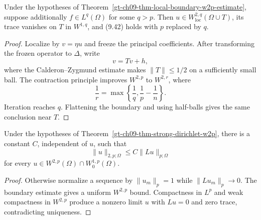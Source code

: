 \begin{lemma}
\label{gt-ch09-lem-boundary-integrability-bootstrap}
Under the hypotheses of
Theorem~\ref{gt-ch09-thm-local-boundary-w2p-estimate}, suppose additionally
$f\in L^q(\Omega)$ for some $q>p$.  Then
$u\in W^{2,q}_{\mathrm{loc}}(\Omega\cup T)$, its trace vanishes on $T$ in
$W^{1,q}$, and (9.42) holds with $p$ replaced by $q$.
\end{lemma}
\begin{proof}
\sketch Localize by $v=\eta u$ and freeze the principal coefficients.
After transforming the frozen operator to $\Delta$, write
\begin{equation}\tag{9.45}
v=Tv+h,
\end{equation}
where the Calderon--Zygmund estimate makes $\|T\|\le1/2$ on a sufficiently
small ball.  The contraction principle improves $W^{2,p}$ to
$W^{2,r}$, where
\[
\frac1r=\max\left\{\frac1q,\frac1p-\frac1n\right\}.
\]
Iteration reaches $q$.  Flattening the boundary and using half-balls gives
the same conclusion near $T$.
\end{proof}

\begin{lemma}
\label{gt-ch09-lem-dirichlet-apriori-w2p}
Under the hypotheses of
Theorem~\ref{gt-ch09-thm-strong-dirichlet-w2p}, there is a constant $C$,
independent of $u$, such that
\begin{equation}\tag{9.46}
\|u\|_{2,p;\Omega}\le C\|Lu\|_{p;\Omega}
\end{equation}
for every $u\in W^{2,p}(\Omega)\cap W^{1,p}_0(\Omega)$.
\end{lemma}
\begin{proof}
\sketch Otherwise normalize a sequence by $\|u_m\|_p=1$ while
$\|Lu_m\|_p\to0$.  The boundary estimate gives a uniform $W^{2,p}$ bound.
Compactness in $L^p$ and weak compactness in $W^{2,p}$ produce a nonzero
limit $u$ with $Lu=0$ and zero trace, contradicting uniqueness.
\end{proof}

